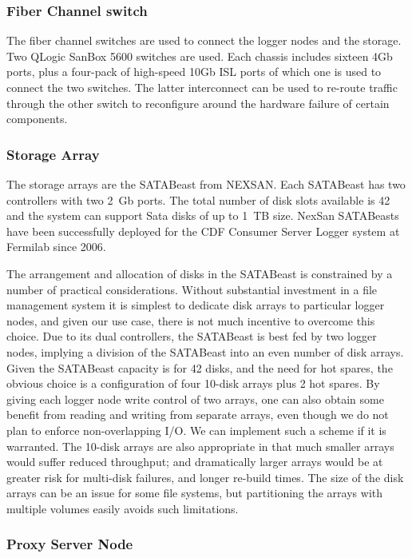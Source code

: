 \subsubsection{Fiber Channel switch}

The fiber channel switches are used to connect the logger nodes and the storage. 
Two QLogic SanBox 5600 switches are used. 
Each chassis includes sixteen 4Gb ports, plus a four-pack of high-speed 10Gb ISL ports 
of which one is used to connect the two switches.
The latter interconnect can be used to re-route traffic through the other switch
to reconfigure around the hardware failure of certain components.

\subsubsection{Storage Array}

The storage arrays are the SATABeast from NEXSAN. 
Each SATABeast has two controllers with two 2~Gb ports.
The total number of disk slots available is 42 and the system can support Sata disks 
of up to 1~TB size. 
NexSan SATABeasts have been successfully deployed for the CDF Consumer Server Logger system 
at Fermilab since 2006.

The arrangement and allocation of disks in the SATABeast is constrained by a number
of practical considerations.
Without substantial investment in a file management system it is simplest
to dedicate disk arrays to particular logger nodes, and given our use case, 
there is not much incentive to overcome this choice.
Due to its dual controllers, the SATABeast is best fed by two logger nodes,
implying a division of the SATABeast into an even number of disk arrays.
Given the  SATABeast capacity is for 42 disks, and the need for hot spares, 
the obvious choice is a configuration of four 10-disk arrays plus 2 hot spares.
By giving each logger node write control of two arrays, one can also obtain some benefit
from reading and writing from separate arrays, even though we do not plan
to enforce non-overlapping I/O. We can implement such a scheme if it is warranted.
The 10-disk arrays are also appropriate in that much smaller arrays would
suffer reduced throughput; and dramatically larger arrays would be at greater
risk for multi-disk failures, and longer re-build times.
The size of the disk arrays can be an issue for some file systems, 
but partitioning the arrays with multiple volumes easily avoids such limitations.
 
\subsubsection{Proxy Server Node}

